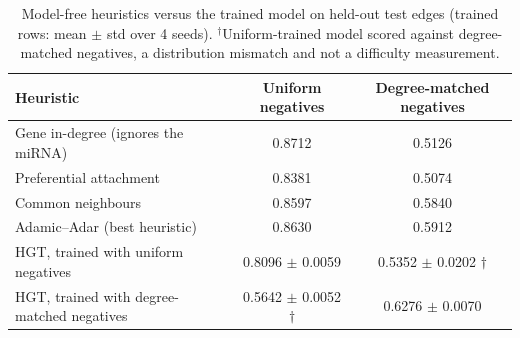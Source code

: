 \begin{table}[h!]
\caption{Model-free heuristics versus the trained model on held-out test edges (trained rows: mean $\pm$ std over 4 seeds). $^{\dagger}$Uniform-trained model scored against degree-matched negatives, a distribution mismatch and not a difficulty measurement.}
\label{tab:model_free_baselines}
\small
\begin{tabular}{lcc}
\hline
Heuristic & Uniform negatives & Degree-matched negatives \\
\hline
Gene in-degree (ignores the miRNA) & 0.8712 & 0.5126 \\
Preferential attachment & 0.8381 & 0.5074 \\
Common neighbours & 0.8597 & 0.5840 \\
Adamic--Adar (best heuristic) & 0.8630 & 0.5912 \\
\hline
HGT, trained with uniform negatives & 0.8096 $\pm$ 0.0059 & 0.5352 $\pm$ 0.0202 $\dagger$ \\
HGT, trained with degree-matched negatives & 0.5642 $\pm$ 0.0052 $\dagger$ & 0.6276 $\pm$ 0.0070 \\
\hline
\end{tabular}
\end{table}
